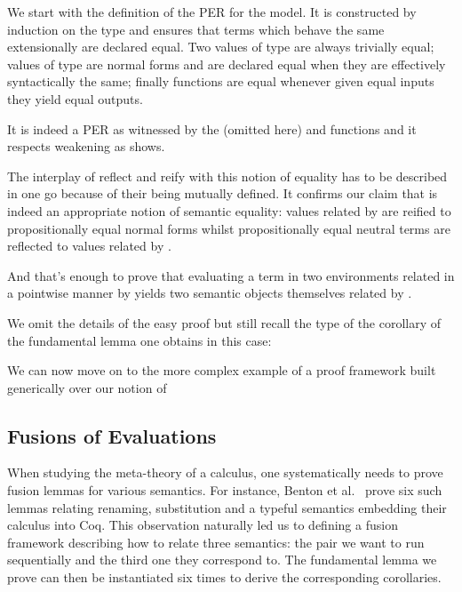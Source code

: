 We start with the definition of the PER for the model. It is constructed
by induction on the type and ensures that terms which behave the same
extensionally are declared equal. Two values of type  are
always trivially equal;  values of type  are normal forms
and are declared equal when they are effectively syntactically the same;
finally functions are equal whenever given equal inputs they yield equal
outputs.


It is indeed a PER as witnessed by the (omitted here)  and
 functions and it respects weakening as  shows.


The interplay of reflect and reify with this notion of equality has
to be described in one go because of their being mutually defined.
It confirms our claim that  is indeed an appropriate notion
of semantic equality: values related by  are reified to
propositionally equal normal forms whilst propositionally equal neutral
terms are reflected to values related by .


And that's enough to prove that evaluating a term in two
environments related in a pointwise manner by 
yields two semantic objects themselves related by .


We omit the details of the easy proof but still recall the type
of the corollary of the fundamental lemma one obtains in this
case:


We can now move on to the more complex example of a proof
framework built generically over our notion of 

\subsection{Fusions of Evaluations}

When studying the meta-theory of a calculus, one systematically
needs to prove fusion lemmas for various semantics. For instance,
Benton et al.~\cite{benton2012strongly} prove six such lemmas
relating renaming, substitution and a typeful semantics embedding
their calculus into Coq. This observation naturally led us to
defining a fusion framework describing how to relate three semantics:
the pair we want to run sequentially and the third one they correspond
to. The fundamental lemma we prove can then be instantiated six times
to derive the corresponding corollaries.

